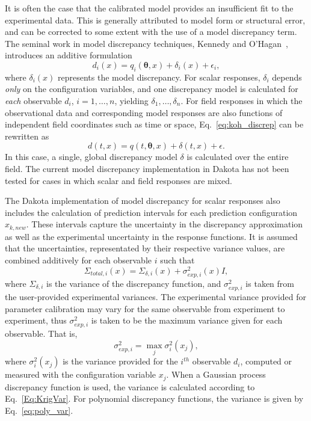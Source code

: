 It is often the case that the calibrated model provides an insufficient fit to
the experimental data. This is generally attributed to model form or 
structural error, and can be corrected to some extent with the use of a model 
discrepancy term. The seminal work in model discrepancy techniques, Kennedy and 
O'Hagan~\cite{Kenn01}, introduces an additive formulation 
\begin{equation}
d_i(x) = q_i\left(\boldsymbol{\theta}, x\right) + \delta_i(x) + \epsilon_i,
\label{eq:koh_discrep}
\end{equation} 
where $\delta_i(x)$ represents the model discrepancy. For scalar responses, 
$\delta_i$ depends \textit{only} on the configuration variables, and one
discrepancy model is calculated for \textit{each} observable $d_i$, $i = 1, 
\ldots, n$, yielding $\delta_1, \ldots, \delta_n$. For field responses in which 
the observational data and corresponding model responses are also functions of 
independent field coordinates such as time or space, Eq.~\ref{eq:koh_discrep} 
can be rewritten as
\begin{equation}
d(t,x) = q(t, \boldsymbol{\theta}, x) + \delta(t,x) + \epsilon.
\end{equation}
In this case, a single, global discrepancy model $\delta$ is calculated over 
the entire field. The current model discrepancy implementation in Dakota has 
not been tested for cases in which scalar and field responses are mixed.

The Dakota implementation of model discrepancy for scalar responses also 
includes the calculation
of prediction intervals for each prediction configuration $x_{k,new}$. These
intervals capture the uncertainty in the discrepancy approximation as well as
the experimental uncertainty in the response functions. It is assumed that the
uncertainties, representated by their respective variance values, are combined 
additively for each observable $i$ such that
\begin{equation}\label{eq:md_totalvar}
\Sigma_{total,i}(x) = \Sigma_{\delta,i}(x) + \sigma^2_{exp,i}(x)I,
\end{equation} 
where $\Sigma_{\delta,i}$ is the variance of the discrepancy function, and
$\sigma^2_{exp,i}$ is taken from the user-provided experimental variances.
The experimental variance provided for parameter calibration may vary for the
same observable from experiment to experiment, thus $\sigma^{2}_{exp,i}$ is
taken to be the maximum variance given for each observable. That is,
\begin{equation}
\sigma^2_{exp,i} = \max_{j} \sigma^2_{i}(x_j), 
\end{equation}
where $\sigma^2_{i}(x_j)$ is the variance provided for the $i^{th}$ observable
$d_i$, computed or measured with the configuration variable $x_j$. 
When a Gaussian process discrepancy function is used, the variance is calculated
according to Eq.~\ref{Eq:KrigVar}. For polynomial discrepancy functions, the
variance is given by Eq.~\ref{eq:poly_var}. 

